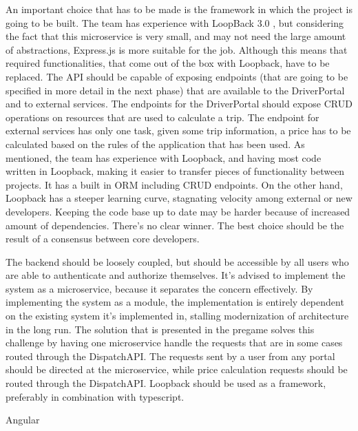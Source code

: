 An important choice that has to be made is the framework in which the project is going to be built. The team has experience with LoopBack 3.0 \cite{lb}, but considering the fact that this microservice is very small, and may not need the large amount of abstractions, Express.js is more suitable for the job. Although this means that required functionalities, that come out of the box with Loopback, have to be replaced. The API should be capable of exposing endpoints (that are going to be specified in more detail in the next phase) that are available to the DriverPortal and to external services. The endpoints for the DriverPortal should expose CRUD operations on resources that are used to calculate a trip. The endpoint for external services has only one task, given some trip information, a price has to be calculated based on the rules of the application that has been used. As mentioned, the team has experience with Loopback, and having most code written in Loopback, making it easier to transfer pieces of functionality between projects. It has a built in ORM including CRUD endpoints. On the other hand, Loopback has a steeper learning curve, stagnating velocity among external or new developers. Keeping the code base up to date may be harder because of increased amount of dependencies. There’s no clear winner. The best choice should be the result of a consensus between core developers.

The backend should be loosely coupled, but should be accessible by all users who are able to authenticate and authorize themselves. It’s advised to implement the system as a microservice, because it separates the concern effectively. By implementing the system as a module, the implementation is entirely dependent on the existing system it’s implemented in, stalling modernization of architecture in the long run. The solution that is presented in the pregame solves this challenge by having one microservice handle the requests that are in some cases routed through the DispatchAPI. The requests sent by a user from any portal should be directed at the microservice, while price calculation requests should be routed through the DispatchAPI. Loopback should be used as a framework, preferably in combination with typescript.

Angular

